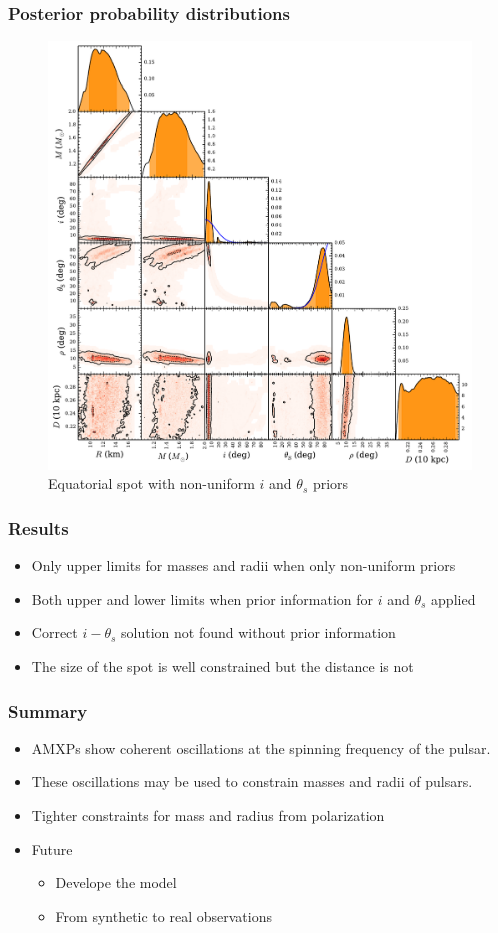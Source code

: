 \documentclass{beamer}
\def\thetas{\theta_{s}}
\begin{document}

\begin{frame}
\frametitle{Posterior probability distributions}

\begin{figure}
\includegraphics[width=0.5\linewidth]{feqprf.pdf}
\caption{Equatorial spot with non-uniform $i$ and $\thetas$ priors}
\end{figure}

\end{frame}


\begin{frame}
\frametitle{Results}
\begin{itemize}
\item Only upper limits for masses and radii when only non-uniform priors
\item Both upper and lower limits when prior information for $i$ and $\thetas$ applied
\item Correct $i-\thetas$ solution not found without prior information
\item The size of the spot is well constrained but the distance is not
\end{itemize}

\end{frame}


\begin{frame}
\frametitle{Summary}
\begin{itemize}
\item AMXPs show coherent oscillations at the spinning frequency of the pulsar.
\item These oscillations may be used to constrain masses and radii of pulsars.
\item Tighter constraints for mass and radius from polarization
\item Future
\begin{itemize}
\item Develope the model
\item From synthetic to real observations
\end{itemize} 

\end{itemize}
\end{frame}
\end{document}
